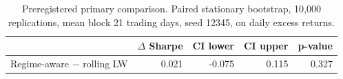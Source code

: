 \begin{table}[htbp]
\caption{Preregistered primary comparison. Paired stationary bootstrap, 10{,}000 replications, mean block 21 trading days, seed 12345, on daily excess returns.}
\label{tab:table2_primary_inference}
\small
\begin{tabular}{lrrrr}
\toprule
 & $\Delta$ Sharpe & CI lower & CI upper & p-value \\
\midrule
Regime-aware $-$ rolling LW & 0.021 & -0.075 & 0.115 & 0.327 \\
\bottomrule
\end{tabular}
\end{table}
